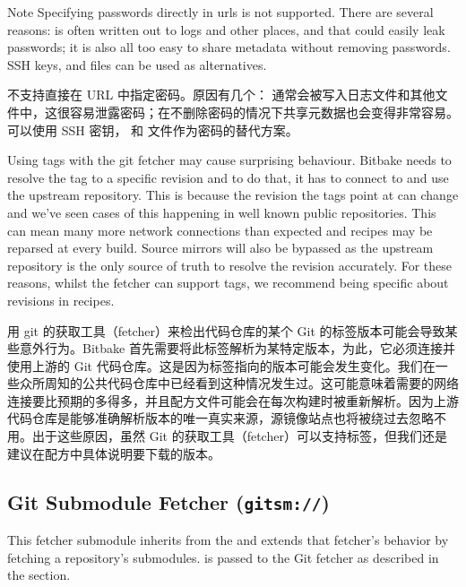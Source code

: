 \medskip
\begin{noteblock}{Note}%
Specifying passwords directly in  urls is not supported. There are several reasons:  is often written out to logs and other places, and that could easily leak passwords; it is also all too easy to share metadata without removing passwords. SSH keys,  and  files can be used as alternatives.

\medskip
{} 不支持直接在 URL 中指定密码。原因有几个：  通常会被写入日志文件和其他文件中，这很容易泄露密码；在不删除密码的情况下共享元数据也会变得非常容易。可以使用 SSH 密钥， 和  文件作为密码的替代方案。
\end{noteblock}

Using tags with the git fetcher may cause surprising behaviour. Bitbake needs to resolve the tag to a specific revision and to do that, it has to connect to and use the upstream repository. This is because the revision the tags point at can change and we've seen cases of this happening in well known public repositories. This can mean many more network connections than expected and recipes may be reparsed at every build. Source mirrors will also be bypassed as the upstream repository is the only source of truth to resolve the revision accurately. For these reasons, whilst the fetcher can support tags, we recommend being specific about revisions in recipes.

用 git 的获取工具（fetcher）来检出代码仓库的某个 Git 的标签版本可能会导致某些意外行为。Bitbake 首先需要将此标签解析为某特定版本，为此，它必须连接并使用上游的 Git 代码仓库。这是因为标签指向的版本可能会发生变化。我们在一些众所周知的公共代码仓库中已经看到这种情况发生过。这可能意味着需要的网络连接要比预期的多得多，并且配方文件可能会在每次构建时被重新解析。因为上游代码仓库是能够准确解析版本的唯一真实来源，源镜像站点也将被绕过去忽略不用。出于这些原因，虽然 Git 的获取工具（fetcher）可以支持标签，但我们还是建议在配方中具体说明要下载的版本。

\subsection{Git Submodule Fetcher (\texttt{gitsm://})}

This fetcher submodule inherits from the  and extends that fetcher's behavior by fetching a repository's submodules.  is passed to the Git fetcher as described in the  section.

